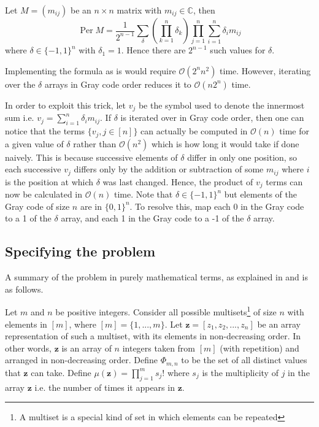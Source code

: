 \documentclass[ %
                    author={Manan Vaswani},
                supervisor={Dr. Raphael Clifford},
                    degree={MEng},
                     title={A multi-core CPU implementation of the classical Boson Sampling algorithm},
                  subtitle={},
                      type={},
                      year={2019} ]{dissertation}
\theoremstyle{plain}
\theoremstyle{definition}
\DeclareMathOperator*{\Per}{\mathrm{Per}}
\begin{document}
Let $M = (m_{ij})$ be an $n \times n$ matrix with $m_{ij} \in \mathbb{C}$, then
\begin{equation}
\Per M = \frac{1}{2^{n-1}} \sum_\delta \left( \prod_{k=1}^n \delta_k \right) \prod_{j=1}^n\sum_{i=1}^n \delta_i m_{ij}
\end{equation}
where $\delta \in \{-1, 1\}^n$ with $\delta_1 = 1$. Hence there are $2^{n-1}$ such values for $\delta$.

Implementing the formula as is would require $\mathcal{O}(2^n n^2)$ time. However, iterating over the $\delta$ arrays in Gray code order reduces it to $\mathcal{O}(n 2^n)$ time.

In order to exploit this trick, let $v_j$ be the symbol used to denote the innermost sum i.e. $v_j = \sum_{i=1}^n \delta_i m_{ij}$. If $\delta$ is iterated over in Gray code order, then one can notice that the terms $\{ v_j, j \in [n]\}$ can actually be computed in $\mathcal{O}(n)$ time for a given value of $\delta$ rather than $\mathcal{O}(n^2)$ which is how long it would take if done naively. This is because successive elements of $\delta$ differ in only one position, so each successive $v_j$ differs only by the addition or subtraction of some $m_{ij}$ where $i$ is the position at which $\delta$ was last changed. Hence, the product of $v_j$ terms can now be calculated in $\mathcal{O}(n)$ time. Note that $\delta \in \{-1, 1\}^n$ but elements of the Gray code of size $n$ are in $\{0, 1\}^n$. To resolve this, map each 0 in the Gray code to a 1 of the $\delta$ array, and each 1 in the Gray code to a -1 of the $\delta$ array.

\subsection{Specifying the problem}
A summary of the problem in purely mathematical terms, as explained in \cite{clifford17} and \cite{aaronson2011} is as follows.

Let $m$ and $n$ be positive integers. Consider all possible multisets\footnote{A multiset is a special kind of set in which elements can be repeated} of size $n$ with elements in $[m]$, where $[m] = \{1, ... , m\}$. Let $\mathbf{z} = [z_1, z_2, ... , z_n]$ be an array representation of such a multiset, with its elements in non-decreasing order. In other words, $\mathbf{z}$ is an array of $n$ integers taken from $[m]$ (with repetition) and arranged in non-decreasing order. Define $\Phi_{m,n}$ to be the set of all distinct values that $\mathbf{z}$ can take. Define $\mu(\mathbf{z}) = \prod_{j=1}^m s_j !$ where $s_j$ is the multiplicity of $j$ in the array $\mathbf{z}$ i.e. the number of times it appears in $\mathbf{z}$.
\end{document}
